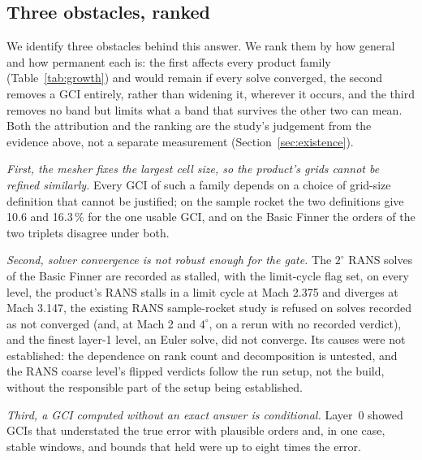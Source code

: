 \documentclass[twocolumn]{labreport}
\begin{document}
\subsection{Three obstacles, ranked}
\label{sec:causes}

We identify three obstacles behind this answer.
We rank them by how general and how permanent each is: the first affects every product family (Table~\ref{tab:growth}) and would remain if every solve converged, the second removes a GCI entirely, rather than widening it, wherever it occurs, and the third removes no band but limits what a band that survives the other two can mean.
Both the attribution and the ranking are the study's judgement from the evidence above, not a separate measurement (Section~\ref{sec:existence}).

\emph{First, the mesher fixes the largest cell size, so the product's grids cannot be refined similarly.}
Every GCI of such a family depends on a choice of grid-size definition that cannot be justified; on the sample rocket the two definitions give 10.6 and 16.3\,\% for the one usable GCI, and on the Basic Finner the orders of the two triplets disagree under both.

\emph{Second, solver convergence is not robust enough for the gate.}
The $2^\circ$ RANS solves of the Basic Finner are recorded as stalled, with the limit-cycle flag set, on every level, the product's RANS stalls in a limit cycle at Mach 2.375 and diverges at Mach 3.147, the existing RANS sample-rocket study is refused on solves recorded as not converged (and, at Mach 2 and $4^\circ$, on a rerun with no recorded verdict), and the finest layer-1 level, an Euler solve, did not converge.
Its causes were not established: the dependence on rank count and decomposition is untested, and the RANS coarse level's flipped verdicts follow the run setup, not the build, without the responsible part of the setup being established.

\emph{Third, a GCI computed without an exact answer is conditional.}
Layer~0 showed GCIs that understated the true error with plausible orders and, in one case, stable windows, and bounds that held were up to eight times the error.
\end{document}

